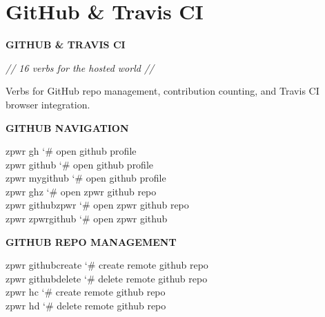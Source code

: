 \documentclass[11pt,a4paper,twoside]{book}
\begin{document}
\vspace{16pt}

\section{GitHub \& Travis CI}


\vspace{10pt}
{\large\bfseries\color{neoncyan} GITHUB \& TRAVIS CI}\vspace{6pt}

{\small\itshape\color{dimtext} // 16 verbs for the hosted world //}

Verbs for GitHub repo management, contribution counting, and Travis CI browser integration.


\vspace{12pt}
{\bfseries\color{neonyellow} GITHUB NAVIGATION}\vspace{4pt}

\begin{codebox}
\color{neongreen}zpwr gh                    {\char`\#} open github profile\\
\color{neongreen}zpwr github                {\char`\#} open github profile\\
\color{neongreen}zpwr mygithub              {\char`\#} open github profile\\
\color{neongreen}zpwr ghz                   {\char`\#} open zpwr github repo\\
\color{neongreen}zpwr githubzpwr            {\char`\#} open zpwr github repo\\
\color{neongreen}zpwr zpwrgithub            {\char`\#} open zpwr github\\
\end{codebox}


\vspace{12pt}
{\bfseries\color{neonyellow} GITHUB REPO MANAGEMENT}\vspace{4pt}

\begin{codebox}
\color{neongreen}zpwr githubcreate          {\char`\#} create remote github repo\\
\color{neongreen}zpwr githubdelete          {\char`\#} delete remote github repo\\
\color{neongreen}zpwr hc                    {\char`\#} create remote github repo\\
\color{neongreen}zpwr hd                    {\char`\#} delete remote github repo\\
\end{codebox}
\end{document}
